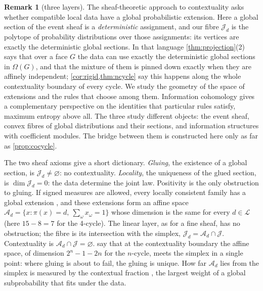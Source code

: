 \documentclass[11pt]{article}
\theoremstyle{definition}\newtheorem{definition}[theorem]{Definition}\newtheorem{remark}[theorem]{Remark}\newtheorem{example}[theorem]{Example}\newtheorem{problem}[theorem]{Open problem}\crefname{problem}{Problem}{Problems}
\begin{document}
\begin{remark}[three layers]\label{rem:layers}
The sheaf-theoretic approach to contextuality \cite{AbramskyBrandenburger2011,AbramskyMansfieldBarbosa2012} asks whether compatible local data have a global probabilistic extension. Here a global section of the event sheaf is a \emph{deterministic} assignment, and our fibre $\mathcal J_d$ is the polytope of probability distributions over those assignments: its vertices are exactly the deterministic global sections. In that language \cref{thm:projection}(2) says that over a face $G$ the data can use exactly the deterministic global sections in $\Omega(G)$, and that the mixture of them is pinned down exactly when they are affinely independent; \cref{cor:rigid,thm:ncycle} say this happens along the whole contextuality boundary of every cycle. We study the geometry of the space of extensions and the rules that choose among them. Information cohomology \cite{BaudotBennequin2015,Vigneaux2020} gives a complementary perspective on the identities that particular rules satisfy, maximum entropy above all. The three study different objects: the event sheaf, convex fibres of global distributions and their sections, and information structures with coefficient modules. The bridge between them is constructed here only as far as \cref{prop:cocycle}.

The two sheaf axioms give a short dictionary. \emph{Gluing}, the existence of a global section, is $\mathcal J_d\neq\varnothing$: no contextuality. \emph{Locality}, the uniqueness of the glued section, is $\dim\mathcal J_d=0$: the data determine the joint law. Positivity is the only obstruction to gluing. If signed measures are allowed, every locally consistent family has a global extension \cite{AbramskyBrandenburger2011,AlSafiShort2013}, and these extensions form an affine space $\mathcal A_d=\{x:\pi(x)=d,\ \sum_\omega x_\omega=1\}$ whose dimension is the same for every $d\in\mathcal L$ (here $15-8=7$ for the 4-cycle). The linear layer, as for a fine sheaf, has no obstruction; the fibre is its intersection with the simplex, $\mathcal J_d=\mathcal A_d\cap\mathcal J$. Contextuality is $\mathcal A_d\cap\mathcal J=\varnothing$.  say that at the contextuality boundary the affine space, of dimension $2^n-1-2n$ for the $n$-cycle, meets the simplex in a single point: where gluing is about to fail, the gluing is unique. How far $\mathcal A_d$ lies from the simplex is measured by the contextual fraction \cite{AbramskyBarbosaMansfield2017}, the largest weight of a global subprobability that fits under the data.
\end{remark}
\end{document}
